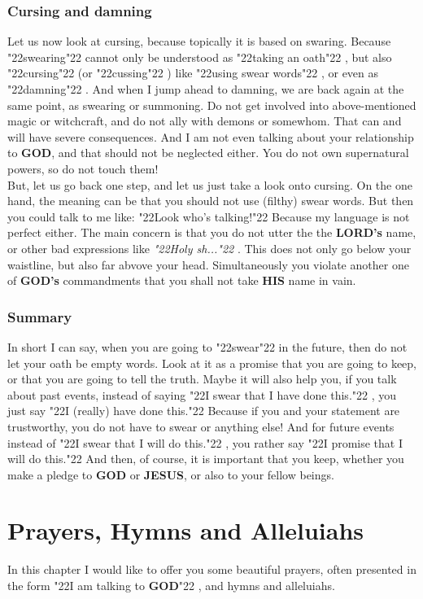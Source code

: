 \documentclass[10pt,a5paper]{article}
\newcommand{\God}[0]{\textbf{GOD}}
\newcommand{\Gods}[0]{\textbf{GOD's}}
\newcommand{\His}[0]{\textbf{HIS}}
\newcommand{\Jesus}[0]{\textbf{JESUS}}
\newcommand{\Lords}[0]{\textbf{LORD's}}
\newcommand{\q}[1]{\char"22{#1}\char"22 }
\begin{document}
	\subsubsection{Cursing and damning}
		Let us now look at cursing,
		because topically it is based on swaring.
		Because \q{swearing} cannot only be understood as \q{taking an oath},
		but also \q{cursing} (or \q{cussing})
		like \q{using swear words},
		or even as \q{damning}.
		And when I jump ahead to damning,
		we are back again at the same point,
		as swearing or summoning.
		Do not get involved into above-mentioned magic or witchcraft,
		and do not ally with demons or somewhom.
		That can and will have severe consequences.
		And I am not even talking about your relationship to {\God},
		and that should not be neglected either.
		You do not own supernatural powers,
		so do not touch them!
		\\
		But,
		let us go back one step,
		and let us just take a look onto cursing.
		On the one hand,
		the meaning can be that you should not use (filthy) swear words.
		But then you could talk to me like:
		\q{Look who's talking!}
		Because my language is not perfect either.
		The main concern is that you do not utter the the {\Lords} name,
		or other bad expressions like \textit{\q{Holy sh...}}.
		This does not only go below your waistline,
		but also far abvove your head.
		Simultaneously you violate another one of {\Gods} commandments that you shall not take {\His} name in vain.

	\subsubsection{Summary}
		In short I can say,
		when you are going to \q{swear} in the future,
		then do not let your oath be empty words.
		Look at it as a promise that you are going to keep,
		or that you are going to tell the truth.
		Maybe it will also help you,
		if you talk about past events,
		instead of saying \q{I swear that I have done this.},
		you just say \q{I (really) have done this.}
		Because if you and your statement are trustworthy,
		you do not have to swear or anything else!
		And for future events instead of \q{I swear that I will do this.},
		you rather say \q{I promise that I will do this.}
		And then,
		of course,
		it is important that you keep,
		whether you make a pledge to {\God} or {\Jesus},
		or also to your fellow beings.

	\newpage
	\section{Prayers, Hymns and Alleluiahs}
		In this chapter I would like to offer you some beautiful prayers,
		often presented in the form \q{I am talking to {\God}},
		and hymns and alleluiahs.
\end{document}
